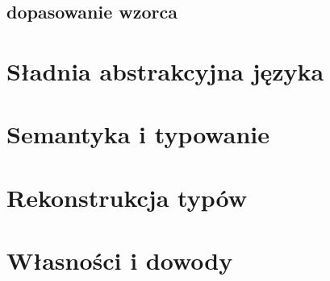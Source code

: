 \documentclass[11pt,leqno]{article}
\begin{document}
\subsection{dopasowanie wzorca}

\section{Sładnia abstrakcyjna języka}
\setcounter{equation}{0}



\section{Semantyka i typowanie}                                 
\setcounter{equation}{0}



\section{Rekonstrukcja typów}


\section{Własności i dowody}
\setcounter{equation}{0}
\end{document}
